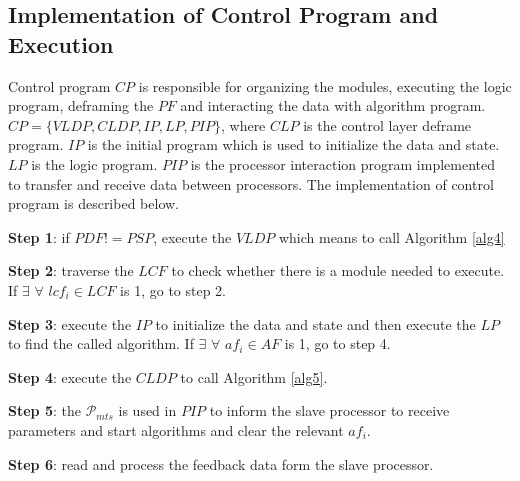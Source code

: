 \documentclass[journal,UTF8]{IEEEtran}
\begin{document}
\subsection{Implementation of Control Program and Execution}
Control program $CP$ is responsible for organizing the modules, executing the logic program, deframing the $PF$ and interacting the data with algorithm program. $CP=\{VLDP,CLDP, IP, LP, PIP\}$, where $CLP$ is the control layer deframe program. $IP$ is the initial program which is used to initialize the data and state. $LP$ is the logic program. $PIP$ is the processor interaction program implemented to transfer and receive data between processors. The implementation of control program is described below.

\textbf{Step 1}: if $PDF!=PSP$, execute the $VLDP$ which means to call Algorithm \ref{alg4}

\textbf{Step 2}: traverse the $LCF$ to check whether there is a module needed to execute. If $\exists$ $\forall$ $lcf_i \in LCF$ is 1, go to step 2.

\textbf{Step 3}: execute the $IP$ to initialize the data and state and then execute the $LP$ to find the called algorithm. If $\exists$ $\forall$ $af_i \in AF$ is 1, go to step 4. 

\textbf{Step 4}: execute the $CLDP$ to call Algorithm \ref{alg5}. 

\textbf{Step 5}: the $\mathcal{P}_{mts}$ is used in $PIP$ to inform the slave processor to receive parameters and start algorithms and clear the relevant $af_i$.   

\textbf{Step 6}: read and process the feedback data form the slave processor. 








\end{document}
